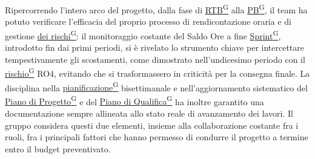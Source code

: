 \documentclass[a4paper,12pt]{article}
\providecommand{\glslink}[2]{\href{https://alittlebyte-19.github.io/Documentazione/glossario.html\#gls-#1}{\underline{#2}\textsuperscript{\scriptsize G}}}
\begin{document}
Ripercorrendo l'intero arco del progetto, dalla fase di \glslink{rtb-requirements-and-technology-baseline}{RTB} alla \glslink{pb-product-baseline}{PB}, il team ha potuto verificare l'efficacia del proprio processo di rendicontazione oraria e di gestione \glslink{mitigazione-dei-rischi}{dei rischi}: il monitoraggio costante del Saldo Ore a fine \glslink{sprint}{Sprint}, introdotto fin dai primi periodi, si è rivelato lo strumento chiave per intercettare tempestivamente gli scostamenti, come dimostrato nell'undicesimo periodo con il \glslink{rischio}{rischio} RO4, evitando che si trasformassero in criticità per la consegna finale. La disciplina nella \glslink{pianificazione}{pianificazione} bisettimanale e nell'aggiornamento sistematico del \glslink{piano-di-progetto}{Piano di Progetto} e del \glslink{piano-di-qualifica}{Piano di Qualifica} ha inoltre garantito una documentazione sempre allineata allo stato reale di avanzamento dei lavori. Il gruppo considera questi due elementi, insieme alla collaborazione costante fra i ruoli, fra i principali fattori che hanno permesso di condurre il progetto a termine entro il budget preventivato.
\end{document}
